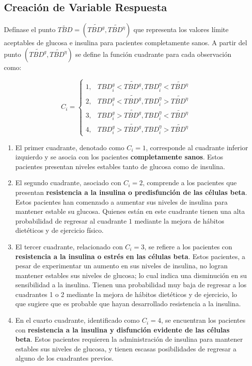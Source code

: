 \subsection{Creación de Variable Respuesta}

Defínase el punto $\widetilde{TBD} = (\widetilde{TBD^g}, \widetilde{TBD^{\eta}})$ que representa los valores límite aceptables de glucosa e insulina para pacientes completamente sanos. A partir del punto $(\widetilde{TBD^g},\widetilde{TBD^{\eta}})$ se define la función cuadrante para cada observación como:

\begin{equation}
     C_ i = \left\{\begin{matrix}
1, & TBD_{i}^{g} < \widetilde{TBD^{g}}, TBD_{i}^{\eta} < \widetilde{TBD^{\eta}}\\
2, & TBD_{i}^{g} < \widetilde{TBD^{g}}, TBD_{i}^{\eta} > \widetilde{TBD^{\eta}}\\
3, & TBD_{i}^{g} > \widetilde{TBD^{g}}, TBD_{i}^{\eta} < \widetilde{TBD^{\eta}}\\
4, & TBD_{i}^{g} > \widetilde{TBD^{g}}, TBD_{i}^{\eta} > \widetilde{TBD^{\eta}}
\end{matrix}\right.
\end{equation}

\begin{enumerate}
    \item El primer cuadrante, denotado como $C_i = 1$, corresponde al cuadrante inferior izquierdo y se asocia con los pacientes \textbf{completamente sanos}. Estos pacientes presentan niveles estables tanto de glucosa como de insulina.
    \item El segundo cuadrante, asociado con $C_i = 2$, comprende a los pacientes que presentan \textbf{resistencia a la insulina o predisfunción de las células beta}. Estos pacientes han comenzado a aumentar sus niveles de insulina para mantener estable su glucosa. Quienes están en este cuadrante tienen una alta probabilidad de regresar al cuadrante $1$ mediante la mejora de hábitos dietéticos y de ejercicio físico.
    \item El tercer cuadrante, relacionado con $C_i = 3$, se refiere a los pacientes con \textbf{resistencia a la insulina o estrés en las células beta}. Estos pacientes, a pesar de experimentar un aumento en sus niveles de insulina, no logran mantener estables sus niveles de glucosa; lo cual indica una disminución en su sensibilidad a la insulina. Tienen una probabilidad muy baja de regresar a los cuadrantes 1 o 2 mediante la mejora de hábitos dietéticos y de ejercicio, lo que sugiere que es probable que hayan desarrollado resistencia a la insulina.
    \item En el cuarto cuadrante, identificado como $C_i = 4$, se encuentran los pacientes con \textbf{resistencia a la insulina y disfunción evidente de las células beta}. Estos pacientes requieren la administración de insulina para mantener estables sus niveles de glucosa, y tienen escasas posibilidades de regresar a alguno de los cuadrantes previos.
\end{enumerate}

